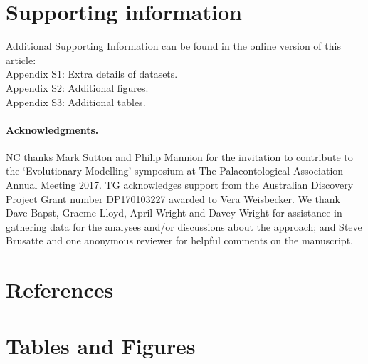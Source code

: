 \documentclass[12pt,a4paper]{article}
\begin{document}
\section{Supporting information}
Additional Supporting Information can be found in the online version of this article:\\
Appendix S1: Extra details of datasets. \\
Appendix S2: Additional figures. \\
Appendix S3: Additional tables.

\paragraph{Acknowledgments.}
  NC thanks Mark Sutton and Philip Mannion for the invitation to contribute to the `Evolutionary Modelling' symposium at The Palaeontological Association Annual Meeting 2017.
  TG acknowledges support from the Australian Discovery Project Grant number DP170103227 awarded to Vera Weisbecker.
  We thank Dave Bapst, Graeme Lloyd, April Wright and Davey Wright for assistance in gathering data for the analyses and/or discussions about the approach; and Steve Brusatte and one anonymous reviewer for helpful comments on the manuscript.

\section{References}

 
 

\newpage
\section{Tables and Figures}

\begin{landscape}
 
\end{landscape}

  
\end{document}
